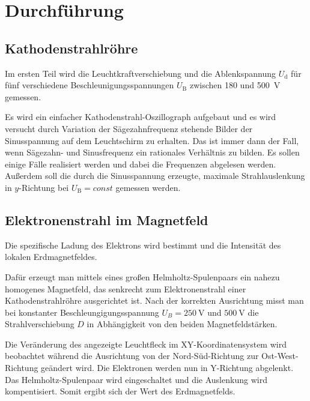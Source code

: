 \section{Durchführung}
\label{sec:Durchführung}

\subsection{Kathodenstrahlröhre}
Im ersten Teil wird die Leuchtkraftverschiebung und die Ablenkspannung $U_\text{d}$ für fünf verschiedene Beschleunigungsspannungen $U_\text{B}$ zwischen \num{180} und \SI{500}{\volt} gemessen. 

Es wird ein einfacher Kathodenstrahl-Oszillograph aufgebaut und es wird versucht durch Variation der Sägezahnfrequenz stehende Bilder der Sinusspannung auf dem Leuchtschirm zu erhalten. Das ist immer dann der Fall, wenn Sägezahn- und Sinusfrequenz ein rationales Verhältnis zu bilden. Es sollen einige Fälle realisiert werden und dabei die Frequenzen abgelesen werden. Außerdem soll die durch die Sinusspannung erzeugte, maximale Strahlauslenkung in $y$-Richtung bei $U_\text{B} = const$ gemessen werden. 

\subsection{Elektronenstrahl im Magnetfeld}
Die spezifische Ladung des Elektrons wird bestimmt und die Intensität des lokalen Erdmagnetfeldes. 

Dafür erzeugt man mittels eines großen Helmholtz-Spulenpaars ein nahezu homogenes Magnetfeld, das senkrecht zum Elektronenstrahl einer Kathodenstrahlröhre ausgerichtet ist. Nach der korrekten Ausrichtung misst man bei konstanter Beschleungigungsspannung $U_B = \SI{250}{\volt}$ und $\SI{500}{\volt}$ die Strahlverschiebung $D$ in Abhängigkeit von den beiden Magnetfeldstärken. 

Die Veränderung des angezeigte Leuchtfleck im XY-Koordinatensystem wird beobachtet während die Ausrichtung von der Nord-Süd-Richtung zur Ost-West-Richtung geändert wird. Die Elektronen werden nun in Y-Richtung abgelenkt. Das Helmholtz-Spulenpaar wird eingeschaltet und die Auslenkung wird kompentisiert. Somit ergibt sich der Wert des Erdmagnetfelds. 
